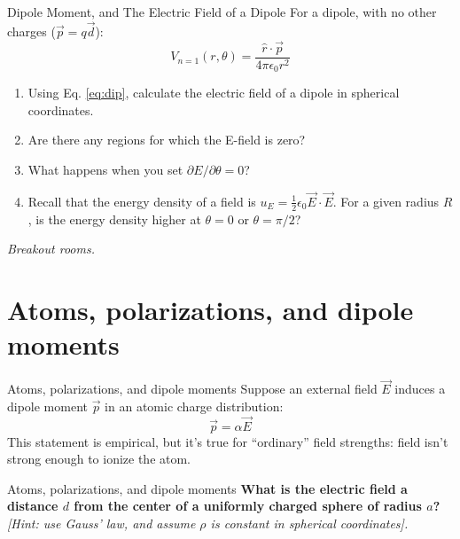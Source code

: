 \documentclass{beamer}
\begin{document}
\begin{frame}{Dipole Moment, and The Electric Field of a Dipole}
For a dipole, with no other charges ($\vec{p} = q\vec{d}$):
\begin{equation}
V_{n=1}(r,\theta) = \frac{\hat{r}\cdot\vec{p}}{4\pi\epsilon_0 r^2} \label{eq:dip}
\end{equation}
\begin{enumerate}
\item Using Eq. \ref{eq:dip}, calculate the electric field of a dipole in spherical coordinates.
\item Are there any regions for which the E-field is zero?
\item What happens when you set $\partial E/\partial \theta = 0$?
\item Recall that the energy density of a field is $u_E = \frac{1}{2}\epsilon_0 \vec{E} \cdot \vec{E}$.  For a given radius $R$, is the energy density higher at $\theta = 0$ or $\theta = \pi/2$?
\end{enumerate}
\textit{Breakout rooms.}
\end{frame}

\section{Atoms, polarizations, and dipole moments}

\begin{frame}{Atoms, polarizations, and dipole moments}
Suppose an external field $\vec{E}$ induces a dipole moment $\vec{p}$ in an atomic charge distribution:
\begin{equation}
\boxed{
\vec{p} = \alpha \vec{E}
}
\end{equation}
This statement is empirical, but it's true for ``ordinary'' field strengths: field isn't strong enough to ionize the atom.
\end{frame}

\begin{frame}{Atoms, polarizations, and dipole moments}
\textbf{What is the electric field a distance $d$ from the center of a uniformly charged sphere of radius $a$?} \textit{[Hint: use Gauss' law, and assume $\rho$ is constant in spherical coordinates].} \\ \vspace{6cm}
\end{frame}
\end{document}
